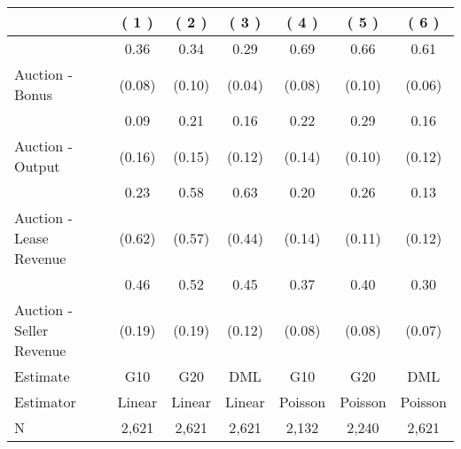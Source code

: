 
\begin{tabular}{lcccccc}
\toprule
  & ( 1 ) & ( 2 ) & ( 3 ) & ( 4 ) & ( 5 ) & ( 6 )\\
\midrule
 & 0.36 & 0.34 & 0.29 & 0.69 & 0.66 & 0.61\\

\multirow{-2}{*}{\raggedright\arraybackslash Auction - Bonus} & (0.08) & (0.10) & (0.04) & (0.08) & (0.10) & (0.06)\\

\midrule
 & 0.09 & 0.21 & 0.16 & 0.22 & 0.29 & 0.16\\

\multirow{-2}{*}{\raggedright\arraybackslash Auction - Output} & (0.16) & (0.15) & (0.12) & (0.14) & (0.10) & (0.12)\\

\midrule
 & 0.23 & 0.58 & 0.63 & 0.20 & 0.26 & 0.13\\

\multirow{-2}{*}{\raggedright\arraybackslash Auction - Lease Revenue} & (0.62) & (0.57) & (0.44) & (0.14) & (0.11) & (0.12)\\

\midrule
 & 0.46 & 0.52 & 0.45 & 0.37 & 0.40 & 0.30\\

\multirow{-2}{*}{\raggedright\arraybackslash Auction - Seller Revenue} & (0.19) & (0.19) & (0.12) & (0.08) & (0.08) & (0.07)\\

\midrule
Estimate & G10 & G20 & DML & G10 & G20 & DML\\

Estimator & Linear & Linear & Linear & Poisson & Poisson & Poisson\\

N & 2,621 & 2,621 & 2,621 & 2,132 & 2,240 & 2,621\\
\bottomrule
\end{tabular}
